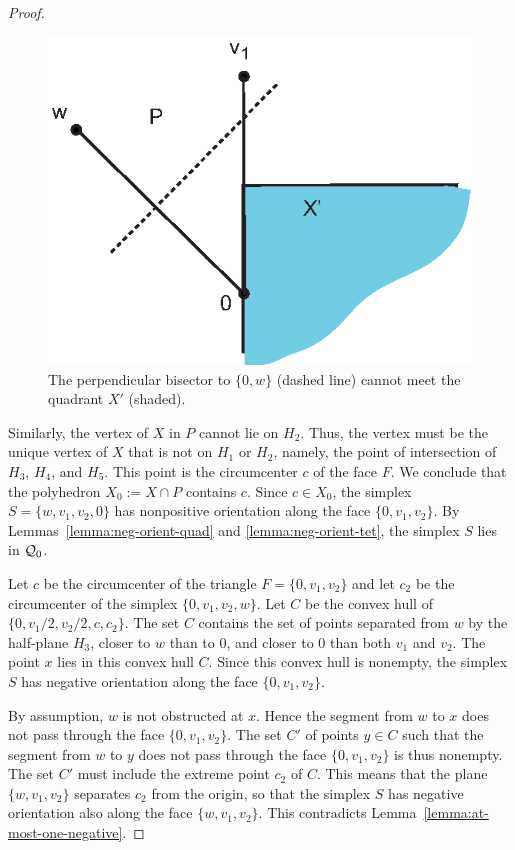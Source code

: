 \begin{proof}
\begin{figure}[htb]
  \centering
  \includegraphics{PS/haII23.eps}
  \caption{The perpendicular bisector to $\{0,w\}$ (dashed line) cannot meet
  the quadrant $X'$ (shaded).}
  \label{fig:haII23}
\end{figure}

Similarly, the vertex of $X$ in $P$ cannot lie on $H_2$.  Thus, the
vertex must be the unique vertex of $X$ that is not on $H_1$ or
$H_2$, namely, the point of intersection of $H_3$, $H_4$, and $H_5$.
This point is the circumcenter $c$ of the face $F$.  We conclude
that the polyhedron $X_0:= X\cap P$ contains $c$. Since $c\in X_0$,
the simplex $S=\{w,v_1,v_2,0\}$ has nonpositive orientation along
the face $\{0,v_1,v_2\}$.  By Lemmas~\ref{lemma:neg-orient-quad} and
\ref{lemma:neg-orient-tet}, the simplex $S$ lies in ${\mathcal Q}_0$.


Let $c$ be the circumcenter of the triangle $F=\{0,v_1,v_2\}$ and
let $c_2$ be the circumcenter of the simplex $\{0,v_1,v_2,w\}$.
Let $C$ be the convex hull of $\{0,v_1/2,v_2/2,c,c_2\}$.  The set
$C$ contains the set of points separated from $w$ by the
half-plane $H_3$, closer to $w$ than to $0$, and closer to $0$
than both $v_1$ and $v_2$. The point $x$ lies in this convex hull
$C$. Since this convex hull is nonempty, the simplex $S$ has
negative orientation along the face $\{0,v_1,v_2\}$.


By assumption, $w$ is not obstructed at $x$. Hence the segment
from $w$ to $x$ does not pass through the face $\{0,v_1,v_2\}$.
The set $C'$ of points $y\in C$ such that the segment from $w$ to
$y$ does not pass through the face $\{0,v_1,v_2\}$ is thus
nonempty. The set $C'$ must include the extreme point $c_2$ of
$C$. This means that the plane $\{w,v_1,v_2\}$ separates $c_2$
from the origin, so that the simplex $S$ has negative orientation
also along the face $\{w,v_1,v_2\}$.  This contradicts
Lemma~\ref{lemma:at-most-one-negative}.
\end{proof}

